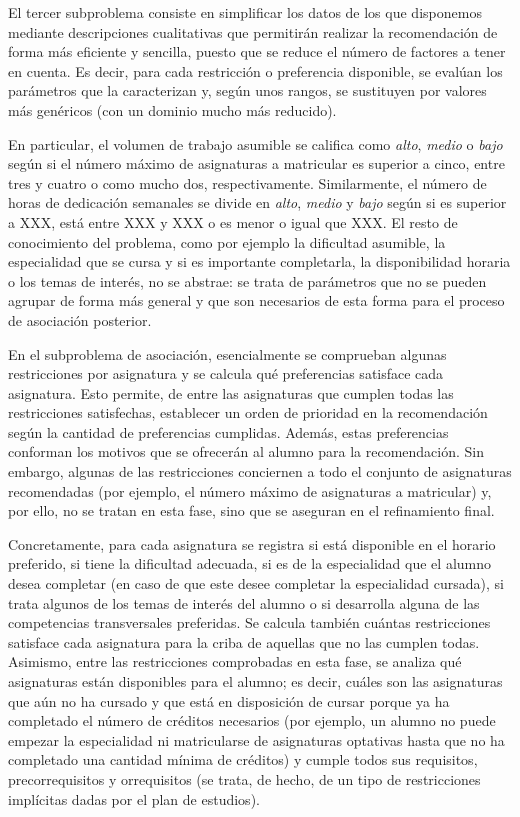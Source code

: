 El tercer subproblema consiste en simplificar los datos de los que disponemos 
mediante descripciones cualitativas que permitirán realizar la recomendación 
de forma más eficiente y sencilla, puesto que se reduce el número de factores 
a tener en cuenta. Es decir, para cada restricción o preferencia disponible, 
se evalúan los parámetros que la caracterizan y, según unos rangos, se 
sustituyen por valores más genéricos (con un dominio mucho más reducido). 

En particular, el volumen de trabajo asumible se califica como \textit{alto}, 
\textit{medio} o \textit{bajo} según si el número máximo de asignaturas a 
matricular es superior a cinco, entre tres y cuatro o como mucho dos, 
respectivamente. Similarmente, el número de horas de dedicación semanales se 
divide en \textit{alto}, \textit{medio} y \textit{bajo} según si es superior 
a XXX, está entre XXX y XXX o es menor o igual que XXX. 
El resto de conocimiento del problema, como por ejemplo la dificultad 
asumible, la especialidad que se cursa y si es importante completarla, la 
disponibilidad horaria o los temas de interés, no se abstrae: se trata de 
parámetros que no se pueden agrupar de forma más general y que son necesarios 
de esta forma para el proceso de asociación posterior.

En el subproblema de asociación, esencialmente se comprueban algunas 
restricciones por asignatura y se calcula qué preferencias satisface cada 
asignatura. Esto permite, de entre las asignaturas que cumplen todas las 
restricciones satisfechas, establecer un orden de prioridad en la 
recomendación según la cantidad de preferencias cumplidas. Además, estas 
preferencias conforman los motivos que se ofrecerán al alumno para la 
recomendación. Sin embargo, algunas de las restricciones conciernen a todo 
el conjunto de asignaturas recomendadas (por ejemplo, el número máximo de 
asignaturas a matricular) y, por ello, no se tratan en esta fase, sino que 
se aseguran en el refinamiento final.

Concretamente, para cada asignatura se registra si está disponible en el 
horario preferido, si tiene la dificultad adecuada, si es de la especialidad 
que el alumno desea completar (en caso de que este desee completar la 
especialidad cursada), si trata algunos de los temas de interés del alumno 
o si desarrolla alguna de las competencias transversales preferidas. Se 
calcula también cuántas restricciones satisface cada asignatura para la criba 
de aquellas que no las cumplen todas. Asimismo, entre las restricciones 
comprobadas en esta fase, se analiza qué asignaturas están disponibles para 
el alumno; es decir, cuáles son las asignaturas que aún no ha cursado y 
que está en disposición de cursar porque ya ha completado el número de 
créditos necesarios (por ejemplo, un alumno no puede empezar la especialidad 
ni matricularse de asignaturas optativas hasta que no ha completado una 
cantidad mínima de créditos) y cumple todos sus requisitos, precorrequisitos 
y orrequisitos (se trata, de hecho, de un tipo de restricciones implícitas 
dadas por el plan de estudios).

